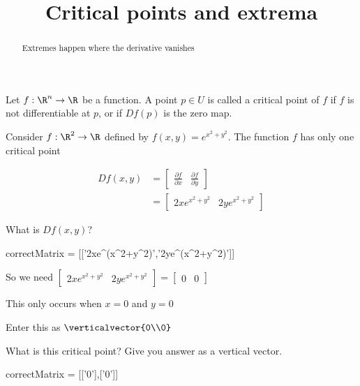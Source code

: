 \documentclass{ximera}
\title{Critical points and extrema}
\begin{document}
	\begin{abstract}
		Extremes happen where the derivative vanishes
	\end{abstract}\maketitle
	
	
	\begin{definition}
		Let $f:\R^n \to \R $ be a function.  A point $p \in U$ is called a critical point of $f$ if $f$ is not differentiable at $p$, or if $Df(p)$ is the zero map.
	\end{definition}
	
	\begin{question}
		Consider \(f: \R^2 \to \R\) defined by $f(x,y) = e^{x^2+y^2}$.  The function $f$ has only one critical point
		\begin{solution}
			\begin{hint}
				\begin{question}
					\begin{solution}
						\begin{hint}
							\begin{align*}
								Df(x,y) &= \begin{bmatrix} \frac{\partial f}{\partial x} & \frac{\partial f}{\partial y}\end{bmatrix}\\
									&= \begin{bmatrix} 2xe^{x^2+y^2} & 2ye^{x^2+y^2}\end{bmatrix}
							\end{align*}
						\end{hint}
						What is $Df(x,y)$?
							\begin{matrix-answer}
								correctMatrix = [['2xe^(x^2+y^2)','2ye^(x^2+y^2)']]
							\end{matrix-answer}
					\end{solution}
				\end{question}
			\end{hint}
			\begin{hint}
				So we need \(\begin{bmatrix} 2xe^{x^2+y^2} & 2ye^{x^2+y^2}\end{bmatrix} = \begin{bmatrix} 0 & 0\end{bmatrix}\)
			\end{hint}
			\begin{hint}
				This only occurs when $x=0$ and $y=0$
			\end{hint}
			\begin{hint}
				Enter this as $\verticalvector{0\\0}$
			\end{hint}
			What is this critical point?  Give you answer as a vertical vector.
			\begin{matrix-answer}
				correctMatrix = [['0'],['0']]
			\end{matrix-answer}
		\end{solution}
	\end{question}
	
\end{document}
